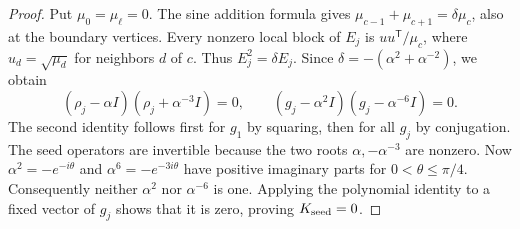 \documentclass[11pt,a4paper]{article}
\begin{document}
\begin{proof}
Put $\mu_0=\mu_\ell=0$. The sine addition formula gives
$\mu_{c-1}+\mu_{c+1}=\delta\mu_c$, also at the boundary vertices.
Every nonzero local block of $E_j$ is $uu^{\mathsf T}/\mu_c$,
where $u_d=\sqrt{\mu_d}$ for neighbors $d$ of $c$. Thus
$E_j^2=\delta E_j$. Since
$\delta=-(\alpha^2+\alpha^{-2})$, we obtain
\[
 (\rho_j-\alpha I)(\rho_j+\alpha^{-3}I)=0,
 \qquad (g_j-\alpha^2I)(g_j-\alpha^{-6}I)=0.
\]
The second identity follows first for $g_1$ by squaring, then for
all $g_j$ by conjugation. The seed operators are invertible because
the two roots $\alpha,-\alpha^{-3}$ are nonzero.
Now $\alpha^2=-e^{-i\theta}$ and $\alpha^6=-e^{-3i\theta}$ have
positive imaginary parts for $0<\theta\le\pi/4$.
Consequently neither $\alpha^2$ nor $\alpha^{-6}$ is one.
Applying the polynomial identity to a fixed vector of $g_j$ shows
that it is zero, proving $K_{\rm seed}=0$.


\end{proof}
\end{document}
